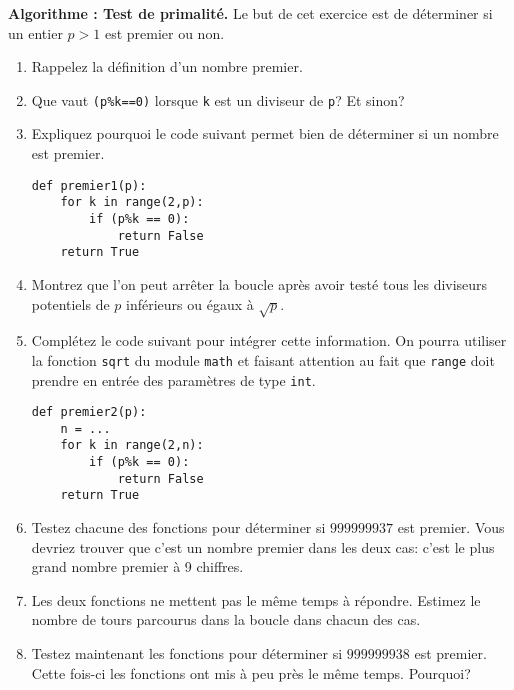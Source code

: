 \begin{exercise}
	\textbf{Algorithme : Test de primalité.} Le but de cet exercice est de déterminer si un entier $p>1$ est premier ou non.
	\begin{enumerate}
		\item Rappelez la définition d'un nombre premier.
		\item Que vaut \texttt{(p\%k==0)} lorsque \texttt{k} est un diviseur de \texttt{p}? Et sinon?
		\item Expliquez pourquoi le code suivant permet bien de déterminer si un nombre est premier.
\begin{center}
	\begin{varwidth}[t]{.5\textwidth}
		\begin{lstlisting}[language=iPython,linewidth = 7cm]
def premier1(p):
    for k in range(2,p):
        if (p%k == 0):
            return False
    return True\end{lstlisting}\end{varwidth}\end{center}
		\item Montrez que l'on peut arrêter la boucle après avoir testé tous les diviseurs potentiels de $p$ inférieurs ou égaux à $\sqrt{p}$.
		\item Complétez le code suivant pour intégrer cette information. On pourra utiliser la fonction \texttt{sqrt} du module \texttt{math} et faisant attention au fait que \texttt{range} doit prendre en entrée des paramètres de type \texttt{int}.
\begin{center}
	\begin{varwidth}[t]{.5\textwidth}
		\begin{lstlisting}[language=iPython,linewidth = 7cm]
def premier2(p):
	n = ...
    for k in range(2,n):
        if (p%k == 0):
            return False
    return True\end{lstlisting}\end{varwidth}\end{center}
	\item Testez chacune des fonctions pour déterminer si $999999937$ est premier. Vous devriez trouver que c'est un nombre premier dans les deux cas: c'est le plus grand nombre premier à 9 chiffres.
	\item Les deux fonctions ne mettent pas le même temps à répondre. Estimez le nombre de tours parcourus dans la boucle dans chacun des cas.
	\item Testez maintenant les fonctions pour déterminer si $999999938$ est premier. Cette fois-ci les fonctions ont mis à peu près le même temps. Pourquoi?
	\end{enumerate}
\end{exercise}

